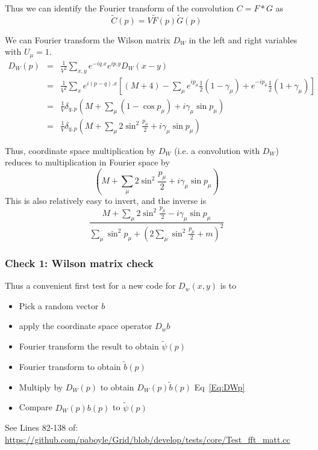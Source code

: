\documentclass[letter,10pt]{report}
\begin{document}
Thus we can identify the Fourier transform of the convolution $C = F \ast G$ as
$$\tilde{C}(p)=V \tilde{F}(p) \tilde{G}(p)$$

We can Fourier transform the Wilson matrix $D_W$ in the left and right variables with $U_\mu=1$.
\begin{eqnarray}
  D_W(p)
  &=&  
\frac{1}{V^2}  \sum\limits_{x,y} e^{-i q.x}e^{i p.y} D_W(x-y)\\
  &=& 
\frac{1}{V^2}
\sum\limits_{x}
e^{i(p-q).x} \left[ (M+4) - \sum_\mu
e^{ip_\mu} \frac{1}{2}(1-\gamma_\mu)
+e^{-ip_\mu} \frac{1}{2}(1+\gamma_\mu) \right]\\
  &=& 
\frac{1}{V}\delta_{q,p} \left( M + \sum_\mu (1-\cos p_\mu) + i \gamma_\mu \sin p_\mu \right)\\
  &=& 
  \label{Eq:DWp}
\frac{1}{V}
\delta_{q,p} \left( M + \sum_\mu 2 \sin^2 \frac{p_\mu}{2} + i \gamma_\mu \sin p_\mu \right)
\end{eqnarray}

Thus, coordinate space multiplication by $D_W$ (i.e. a convolution with $D_W$) reduces to multiplication in Fourier space by
$$
\left( M + \sum_\mu 2 \sin^2 \frac{p_\mu}{2} + i \gamma_\mu \sin p_\mu \right)
$$
This is also relatively easy to invert, and the inverse is
$$
\frac{M+\sum_\mu  2 \sin^2 \frac{p_\mu}{2} -i \gamma_\mu \sin p_\mu }{ \sum_\mu \sin^2 p_\mu + (2 \sum_\mu \sin^2 \frac{p_\mu}{2} + m)^2 }
$$

\subsubsection{Check 1: Wilson matrix check}

Thus a convenient first test for a new code for $D_w(x,y)$ is to
\begin{itemize}
  \item Pick a random vector $b$
  \item apply the coordinate space operator $D_w b$
  \item Fourier transform the result to obtain $\tilde{\psi}(p)$
  \item Fourier transform to obtain $\tilde{b}(p)$
  \item Multiply by $D_W(p)$ to obtain $D_W(p) \tilde{b}(p)$ Eq~\ref{Eq:DWp}
  \item Compare $ D_W(p) b(p)$ to $\tilde{\psi}(p)$
\end{itemize}

See Lines 82-138 of:
\href{https://github.com/paboyle/Grid/blob/develop/tests/core/Test\_fft\_matt.cc}{https://github.com/paboyle/Grid/blob/develop/tests/core/Test\_fft\_matt.cc}
\end{document}
